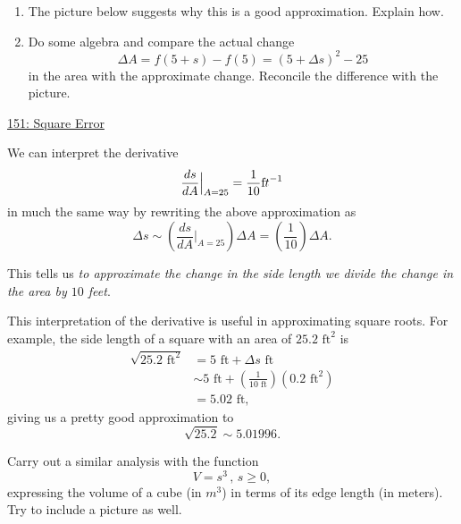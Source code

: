 \documentclass{ximera}
\begin{document}
\begin{example}
\begin{enumerate}
\item The picture below suggests why this is a good approximation. Explain how. 

\item Do some algebra and compare the actual change 
\[
    \Delta A = f(5+s) - f(5) = (5+\Delta s)^2 - 25
\]
in the area with the approximate change. Reconcile the difference with the picture.

\end{enumerate}
\begin{freeResponse}
\end{freeResponse}

\begin{onlineOnly}
    \begin{center}
\end{center}
\end{onlineOnly}


\href{https://www.desmos.com/calculator/h2fm6mm8ua}{151: Square Error}


We can interpret the derivative 
\[
    \frac{ds}{dA}\Big|_{A=25} = \frac{1}{10} {\text ft}^{-1}
\]
in much the same way by rewriting the above approximation as
\[
    \Delta s \sim \left( \frac{ds}{dA}\Big|_{A=25}\right)\Delta A = \left(\frac{1}{10}\right) \Delta A.
\]

This tells us \emph{to approximate the change in the side length we divide the change in the area by $10$ feet}.

This interpretation of the derivative is useful in approximating square roots. For example,  the side length of a square with an area of $25.2 \text{ ft}^2$ is 
\begin{align*}
              \sqrt{25.2\text{ ft}^2} &=      5 \text{ ft} + \Delta s  \text{ ft}  \\
                               & \sim 5 \text{ ft} +   \left(\frac{1}{10 \text{ ft}}\right)(0.2 \text{ ft}^2) \\
                                      &= 5.02 \text{ ft},
\end{align*}
giving us a pretty good approximation to 
\[
    \sqrt{25.2} \sim 5.01996 .
\]
\end{example}


\begin{exercise}  \label{ExLDFDFDdare}
Carry out a similar analysis with the function
\[
    V = s^3 \, , \, s\geq 0,
\]
expressing the volume of a cube (in $m^3$) in terms of its edge length (in meters). Try to include a picture as well.
\end{exercise}
\end{document}
